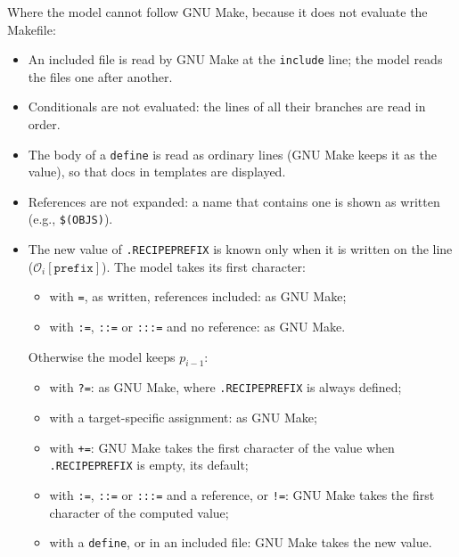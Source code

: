\documentclass[11pt]{article}
\newcommand{\code}[1]{\mbox{\texttt{#1}}}
\newcommand{\field}[1]{\texttt{#1}}
\newcommand{\Obs}[1]{\mathcal{O}_i[\field{#1}]}
\begin{document}
Where the model cannot follow GNU Make, because it does not evaluate the Makefile:
\begin{itemize}
  \item An included file is read by GNU Make at the \code{include} line; the model reads
        the files one after another.
  \item Conditionals are not evaluated: the lines of all their branches are read in order.
  \item The body of a \code{define} is read as ordinary lines (GNU Make keeps it as the
        value), so that docs in templates are displayed.
  \item References are not expanded: a name that contains one is shown as written (e.g.,
        \code{\$(OBJS)}).
  \item The new value of \code{.RECIPEPREFIX} is known only when it is written on the line
        ($\Obs{prefix}$). The model takes its first character:
        \begin{itemize}
          \item with \code{=}, as written, references included: as GNU Make;
          \item with \code{:=}, \code{::=} or \code{:::=} and no reference: as GNU Make.
        \end{itemize}
        Otherwise the model keeps $p_{i-1}$:
        \begin{itemize}
          \item with \code{?=}: as GNU Make, where \code{.RECIPEPREFIX} is always defined;
          \item with a target-specific assignment: as GNU Make;
          \item with \code{+=}: GNU Make takes the first character of the value when
                \code{.RECIPEPREFIX} is empty, its default;
          \item with \code{:=}, \code{::=} or \code{:::=} and a reference, or \code{!=}:
                GNU Make takes the first character of the computed value;
          \item with a \code{define}, or in an included file: GNU Make takes the new
                value.
        \end{itemize}
\end{itemize}
\end{document}
